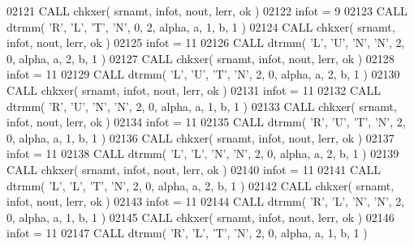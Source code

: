 \begin{DoxyCode}
02121       \textcolor{keyword}{CALL }chkxer( srnamt, infot, nout, lerr, ok )
02122       infot = 9
02123       \textcolor{keyword}{CALL }dtrmm( \textcolor{stringliteral}{'R'}, \textcolor{stringliteral}{'L'}, \textcolor{stringliteral}{'T'}, \textcolor{stringliteral}{'N'}, 0, 2, alpha, a, 1, b, 1 )
02124       \textcolor{keyword}{CALL }chkxer( srnamt, infot, nout, lerr, ok )
02125       infot = 11
02126       \textcolor{keyword}{CALL }dtrmm( \textcolor{stringliteral}{'L'}, \textcolor{stringliteral}{'U'}, \textcolor{stringliteral}{'N'}, \textcolor{stringliteral}{'N'}, 2, 0, alpha, a, 2, b, 1 )
02127       \textcolor{keyword}{CALL }chkxer( srnamt, infot, nout, lerr, ok )
02128       infot = 11
02129       \textcolor{keyword}{CALL }dtrmm( \textcolor{stringliteral}{'L'}, \textcolor{stringliteral}{'U'}, \textcolor{stringliteral}{'T'}, \textcolor{stringliteral}{'N'}, 2, 0, alpha, a, 2, b, 1 )
02130       \textcolor{keyword}{CALL }chkxer( srnamt, infot, nout, lerr, ok )
02131       infot = 11
02132       \textcolor{keyword}{CALL }dtrmm( \textcolor{stringliteral}{'R'}, \textcolor{stringliteral}{'U'}, \textcolor{stringliteral}{'N'}, \textcolor{stringliteral}{'N'}, 2, 0, alpha, a, 1, b, 1 )
02133       \textcolor{keyword}{CALL }chkxer( srnamt, infot, nout, lerr, ok )
02134       infot = 11
02135       \textcolor{keyword}{CALL }dtrmm( \textcolor{stringliteral}{'R'}, \textcolor{stringliteral}{'U'}, \textcolor{stringliteral}{'T'}, \textcolor{stringliteral}{'N'}, 2, 0, alpha, a, 1, b, 1 )
02136       \textcolor{keyword}{CALL }chkxer( srnamt, infot, nout, lerr, ok )
02137       infot = 11
02138       \textcolor{keyword}{CALL }dtrmm( \textcolor{stringliteral}{'L'}, \textcolor{stringliteral}{'L'}, \textcolor{stringliteral}{'N'}, \textcolor{stringliteral}{'N'}, 2, 0, alpha, a, 2, b, 1 )
02139       \textcolor{keyword}{CALL }chkxer( srnamt, infot, nout, lerr, ok )
02140       infot = 11
02141       \textcolor{keyword}{CALL }dtrmm( \textcolor{stringliteral}{'L'}, \textcolor{stringliteral}{'L'}, \textcolor{stringliteral}{'T'}, \textcolor{stringliteral}{'N'}, 2, 0, alpha, a, 2, b, 1 )
02142       \textcolor{keyword}{CALL }chkxer( srnamt, infot, nout, lerr, ok )
02143       infot = 11
02144       \textcolor{keyword}{CALL }dtrmm( \textcolor{stringliteral}{'R'}, \textcolor{stringliteral}{'L'}, \textcolor{stringliteral}{'N'}, \textcolor{stringliteral}{'N'}, 2, 0, alpha, a, 1, b, 1 )
02145       \textcolor{keyword}{CALL }chkxer( srnamt, infot, nout, lerr, ok )
02146       infot = 11
02147       \textcolor{keyword}{CALL }dtrmm( \textcolor{stringliteral}{'R'}, \textcolor{stringliteral}{'L'}, \textcolor{stringliteral}{'T'}, \textcolor{stringliteral}{'N'}, 2, 0, alpha, a, 1, b, 1 )

\end{DoxyCode}
